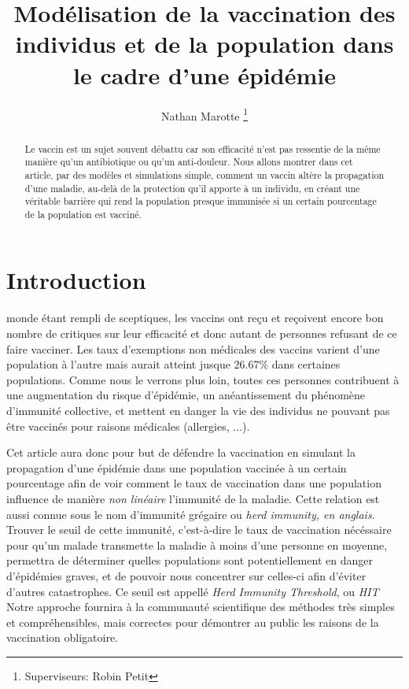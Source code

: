 \documentclass[journal, a4paper]{IEEEtran}
\begin{document}
	\title{Modélisation de la vaccination des individus et de la population dans le cadre d'une épidémie}
	\author{Nathan Marotte
	\thanks{Superviseurs: Robin Petit}}
	\maketitle

\begin{abstract}
	Le vaccin est un sujet souvent débattu car son efficacité n'est pas ressentie de la même manière qu'un antibiotique ou qu'un anti-douleur. Nous allons montrer dans cet article, par des modèles et simulations simple, comment un vaccin altère la propagation d'une maladie, au-delà de la protection qu'il apporte à un individu, en créant une véritable barrière qui rend la population presque immunisée si un certain pourcentage de la population est vacciné.
\end{abstract}

\section{Introduction}
	 monde étant rempli de sceptiques, les vaccins ont reçu et reçoivent encore bon nombre de critiques sur leur efficacité et donc autant de personnes refusant de ce faire vacciner. Les taux d'exemptions non médicales des vaccins varient d'une population à l'autre mais aurait atteint jusque 26.67\% \cite{NME_vaccine} dans certaines populations. Comme nous le verrons plus loin, toutes ces personnes contribuent à une augmentation du risque d'épidémie, un anéantissement du phénomène d'immunité collective, et mettent en danger la vie des individus ne pouvant pas être vaccinés pour raisons médicales (allergies, ...).\

	Cet article aura donc pour but de défendre la vaccination en simulant la propagation d'une épidémie dans une population vaccinée à un certain pourcentage afin de voir comment le taux de vaccination dans une population influence de manière \emph{non linéaire} l'immunité de la maladie. Cette relation est aussi connue sous le nom d'immunité grégaire ou \emph{herd immunity, en anglais}.
	Trouver le seuil de cette immunité, c'est-à-dire le taux de vaccination nécéssaire pour qu'un malade transmette la maladie à moins d'une personne en moyenne, permettra de déterminer quelles populations sont potentiellement en danger d'épidémies graves, et de pouvoir nous concentrer sur celles-ci afin d'éviter d'autres catastrophes. Ce seuil est appellé \emph{Herd Immunity Threshold}, ou \emph{HIT}
	Notre approche fournira à la communauté scientifique des méthodes très simples et compréhensibles, mais correctes pour démontrer au public les raisons de la vaccination obligatoire.
\end{document}
